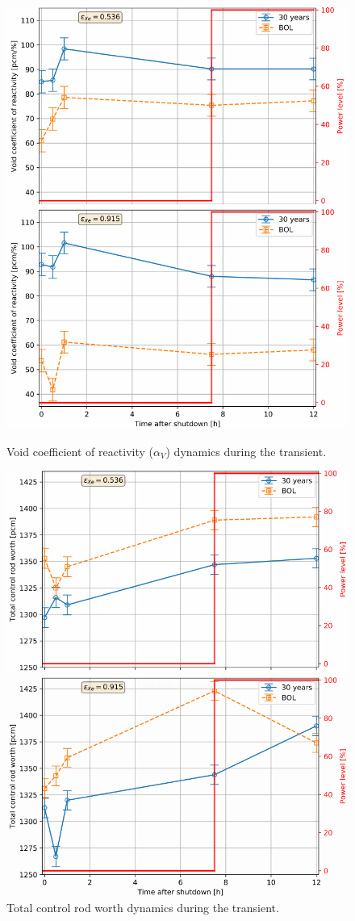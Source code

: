 \begin{frame}
\begin{textblock*}{12.5cm}
\begin{columns}
\begin{figure}[t]
\begin{overprint}
				\includegraphics[width=0.87\linewidth]{./images/msbr_void_evo.png}
				\vspace{-2mm}
				\caption{Void coefficient of reactivity ($\alpha_V$) dynamics
					during the transient.}
				\includegraphics[width=0.87\linewidth]{./images/msbr_crw_evo.png}
				\vspace{-2mm}
				\caption{Total control rod worth dynamics during 
				the transient.}
			\end{overprint}
		\end{figure}
		

\end{columns}
\end{textblock*}
\end{frame}
